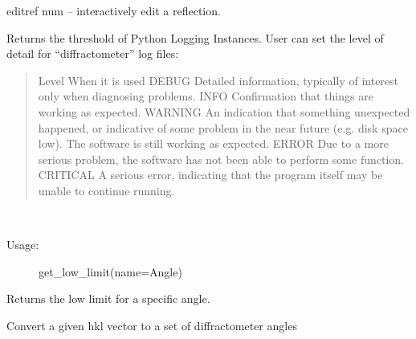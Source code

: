 \documentclass[letterpaper,10pt,english]{sphinxmanual}
\begin{document}

\begin{fulllineitems}
\label{Manual:commands.editref}
editref num -- interactively edit a reflection.

\end{fulllineitems}


\begin{fulllineitems}
\label{Manual:commands.getLogLevel}
Returns the threshold of Python Logging Instances. User can set the level of detail
for ``diffractometer'' log files:
\begin{quote}

Level       When it is used
DEBUG       Detailed information, typically of interest only when diagnosing problems.
INFO        Confirmation that things are working as expected.
WARNING     An indication that something unexpected happened, or indicative of some problem in the near future (e.g. disk space low). The software is still working as expected.
ERROR       Due to a more serious problem, the software has not been able to perform some function.
CRITICAL    A serious error, indicating that the program itself may be unable to continue running.
\end{quote}

\end{fulllineitems}


\begin{fulllineitems}
\label{Manual:commands.get_low_limit}~\begin{description}
\item[{Usage: }] \leavevmode
get\_low\_limit(name=Angle)

\end{description}

Returns the low limit for a specific angle.

\end{fulllineitems}


\begin{fulllineitems}
\label{Manual:commands.hkl_to_angles}
Convert a given hkl vector to a set of diffractometer angles

\end{fulllineitems}
\end{document}
